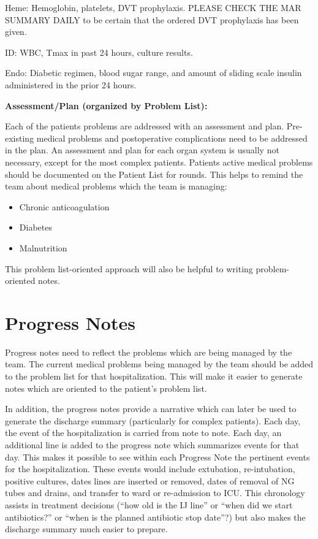 \documentclass[
  letterpaper,
]{scrbook}
\providecommand{\tightlist}{%
  \setlength{\itemsep}{0pt}\setlength{\parskip}{0pt}}
\begin{document}
Heme: Hemoglobin, platelets, DVT prophylaxis. PLEASE CHECK THE MAR
SUMMARY DAILY to be certain that the ordered DVT prophylaxis has been
given.

ID: WBC, Tmax in past 24 hours, culture results.

Endo: Diabetic regimen, blood sugar range, and amount of sliding scale
insulin administered in the prior 24 hours.

\textbf{Assessment/Plan (organized by Problem List):}

Each of the patients problems are addressed with an assessment and plan.
Pre-existing medical problems and postoperative complications need to be
addressed in the plan. An assessment and plan for each organ system is
usually not necessary, except for the most complex patients. Patients
active medical problems should be documented on the Patient List for
rounds. This helps to remind the team about medical problems which the
team is managing:

\begin{itemize}
\tightlist
\item
  Chronic anticoagulation
\item
  Diabetes
\item
  Malnutrition
\end{itemize}

This problem list-oriented approach will also be helpful to writing
problem-oriented notes.

\chapter{Progress Notes}\label{progress-notes}

Progress notes need to reflect the problems which are being managed by
the team. The current medical problems being managed by the team should
be added to the problem list for that hospitalization. This will make it
easier to generate notes which are oriented to the patient's problem
list.

In addition, the progress notes provide a narrative which can later be
used to generate the discharge summary (particularly for complex
patients). Each day, the event of the hospitalization is carried from
note to note. Each day, an additional line is added to the progress note
which summarizes events for that day. This makes it possible to see
within each Progress Note the pertinent events for the hospitalization.
These events would include extubation, re-intubation, positive cultures,
dates lines are inserted or removed, dates of removal of NG tubes and
drains, and transfer to ward or re-admission to ICU. This chronology
assists in treatment decisions (``how old is the IJ line'' or ``when did
we start antibiotics?'' or ``when is the planned antibiotic stop
date''?) but also makes the discharge summary much easier to prepare.
\end{document}
